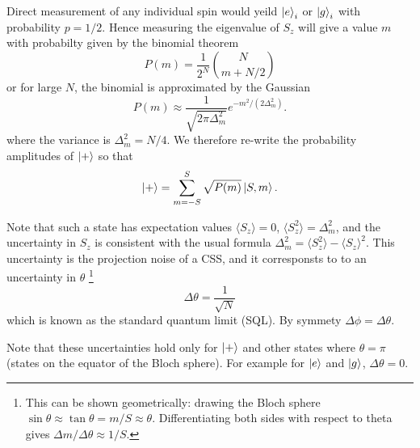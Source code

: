 \documentclass{article}
\begin{document}
Direct measurement of any individual spin would yeild $\ket{e}_i$ or
$\ket{g}_i$ with probability $p=1/2$. Hence measuring the eigenvalue of $S_z$
will give a value $m$ with probabilty given by the binomial theorem~\cite{}
%
\begin{equation}
  P(m) = \frac{1}{2^N} {N \choose m +N/2}
\end{equation}
%
or for large $N$, the binomial is approximated by the Gaussian
%
\begin{equation}
  P(m) \approx\frac{1}{\sqrt{2\pi \Delta_m^2}} e^{-m^2/(2\Delta_m^2)}.
\end{equation}
%
where the variance is $\Delta_m^2 = N/4$. We therefore re-write the probability
amplitudes of $\ket{+}$ so that
%
\begin{equation}
  \ket{+} = \sum_{m=-S}^S \sqrt{P(m)}\ket{S,m}.
\end{equation}

Note that such a state has expectation values $\langle S_z \rangle = 0$,
$\langle S_z^2\rangle = \Delta_m^2$, and the uncertainty in $S_z$ is consistent
with the usual formula $\Delta_m^2 = \langle S_z^2 \rangle - \langle
S_z\rangle^2$. This uncertainty is the projection noise of a CSS, and it
corresponsts to to an uncertainty in $\theta$
%
\footnote{This can be shown geometrically: drawing the Bloch sphere $\sin
\theta \approx \tan \theta = m/S \approx \theta$. Differentiating both sides
with respect to theta gives $\Delta m / \Delta \theta \approx 1/S$.
}
%
\begin{equation}
  \Delta\theta = \frac{1}{\sqrt{N}}
\end{equation}
which is known as the standard quantum limit (SQL). By symmety $\Delta \phi =
\Delta \theta$.

Note that these uncertainties hold only for $\ket{+}$ and other states where
$\theta = \pi$ (states on the equator of the Bloch sphere). For example for
$\ket{e}$ and $\ket{g}$, $\Delta \theta = 0$. %

%
\end{document}
